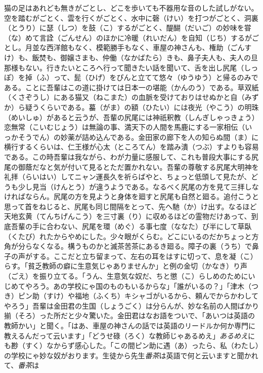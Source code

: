 \documentclass{book}
\begin{document}
猫の足はあれども無きがごとし、どこを歩いても不器用な音のした試しがない。空を踏むがごとく、雲を行くがごとく、水中に磬（けい）を打つがごとく、洞裏（とうり）に瑟（しつ）を鼓（こ）するがごとく、醍醐（だいご）の妙味を甞（な）めて言詮（ごんせん）のほかに冷暖（れいだん）を自知（じち）するがごとし。月並な西洋館もなく、模範勝手もなく、車屋の神さんも、権助（ごんすけ）も、飯焚も、御嬢さまも、仲働（なかばたら）きも、鼻子夫人も、夫人の旦那様もない。行きたいところへ行って聞きたい話を聞いて、舌を出し尻尾（しっぽ）を掉（ふ）って、髭（ひげ）をぴんと立てて悠々（ゆうゆう）と帰るのみである。ことに吾輩はこの道に掛けては日本一の堪能（かんのう）である。草双紙（くさぞうし）にある猫又（ねこまた）の血脈を受けておりはせぬかと自（みずか）ら疑うくらいである。蟇（がま）の額（ひたい）には夜光（やこう）の明珠（めいしゅ）があると云うが、吾輩の尻尾には神祇釈教（しんぎしゃっきょう）恋無常（こいむじょう）は無論の事、満天下の人間を馬鹿にする一家相伝（いっかそうでん）の妙薬が詰め込んである。金田家の廊下を人の知らぬ間（ま）に横行するくらいは、仁王様が心太（ところてん）を踏み潰（つぶ）すよりも容易である。この時吾輩は我ながら、わが力量に感服して、これも普段大事にする尻尾の御蔭だなと気が付いて見るとただ置かれない。吾輩の尊敬する尻尾大明神を礼拝（らいはい）してニャン運長久を祈らばやと、ちょっと低頭して見たが、どうも少し見当（けんとう）が違うようである。なるべく尻尾の方を見て三拝しなければならん。尻尾の方を見ようと身体を廻すと尻尾も自然と廻る。追付こうと思って首をねじると、尻尾も同じ間隔をとって、先へ馳（か）け出す。なるほど天地玄黄（てんちげんこう）を三寸裏（り）に収めるほどの霊物だけあって、到底吾輩の手に合わない、尻尾を環（めぐ）る事七度（ななた）び半にして草臥（くたび）れたからやめにした。少々眼がくらむ。どこにいるのだかちょっと方角が分らなくなる。構うものかと滅茶苦茶にあるき廻る。障子の裏（うち）で鼻子の声がする。ここだと立ち留まって、左右の耳をはすに切って、息を凝（こ）らす。「貧乏教師の癖に生意気じゃありませんか」と例の金切（かなき）り声（ごえ）を振り立てる。「うん、生意気な奴だ、ちと懲（こ）らしめのためにいじめてやろう。あの学校にゃ国のものもいるからな」「誰がいるの？」「津木（つき）ピン助（すけ）や福地（ふくち）キシャゴがいるから、頼んでからかわしてやろう」吾輩は金田君の生国（しょうごく）は分らんが、妙な名前の人間ばかり揃（そろ）った所だと少々驚いた。金田君はなお語をついで、「あいつは英語の教師かい」と聞く。「はあ、車屋の神さんの話では英語のリードルか何か専門に教えるんだって云います」「どうせ碌（ろく）な教師じゃあるめえ」\emph{あるめえ}にも尠（すく）なからず感心した。「この間ピン助に遇（あ）ったら、私（わたし）の学校にゃ妙な奴がおります。生徒から先生\emph{番茶}は英語で何と云いますと聞かれて、\emph{番茶}は
\end{document}

